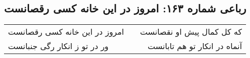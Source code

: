 \begin{center}
\section*{رباعی شماره ۱۶۳: امروز در این خانه کسی رقصانست}
\label{sec:0163}
\begin{longtable}{l p{0.5cm} r}
امروز در این خانه کسی رقصانست
&&
که کل کمال پیش او نقصانست
\\
ور در تو ز انکار رگی جنبانست
&&
آنماه در انکار تو هم تابانست
\\
\end{longtable}
\end{center}
